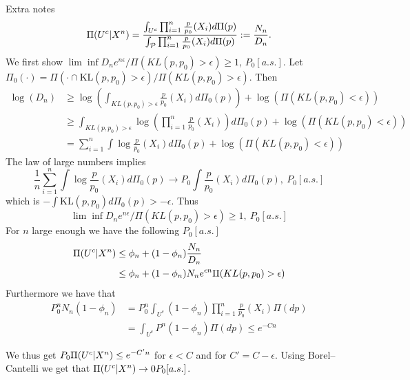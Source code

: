 \begin{frame}[allowframebreaks]{Extra notes} 
$$
\Pi(U^c|X^n) = {\int_{U^c} \prod_{i=1}^n  \frac{p}{p_0}(X_i) d\Pi(p) \over \int_{\mathcal{P}} \prod_{i=1}^n  \frac{p}{p_0}(X_i) d\Pi(p)} := \frac{N_n}{D_n}.
$$
We first show $\lim\inf D_n e^{n\epsilon} / \Pi(KL(p,p_0)>\epsilon)   \geq 1 $, $P_0[a.s.]$. Let $\Pi_0(\cdot) = \Pi(\cdot \cap \text{KL}(p,p_0)>\epsilon)/\Pi(KL(p,p_0)>\epsilon)$. Then 
\begin{align*}
\log(D_n) &\geq \log\left(\int_{KL(p,p_0)>\epsilon} \frac{p}{p_0}(X_i) d\Pi_0(p)\right) + \log(\Pi(KL(p,p_0)<\epsilon)) \\ 
&\geq \int_{KL(p,p_0)>\epsilon} \log\left( \prod_{i=1}^n  \frac{p}{p_0}(X_i) \right) d\Pi_0(p) + \log(\Pi(KL(p,p_0)<\epsilon)) \\ 
&=  \sum_{i=1}^n \int \log \frac{p}{p_0}(X_i) d\Pi_0(p) + \log(\Pi(KL(p,p_0)<\epsilon)) 
\end{align*}
The law of large numbers implies 
$$
\frac{1}{n} \sum_{i=1}^n \int \log \frac{p}{p_0}(X_i) d\Pi_0(p) \to P_0 \int \frac{p}{p_0}(X_i) d\Pi_0(p),~ P_0[a.s.] 
$$
which is $- \int \text{KL}(p,p_0) d\Pi_0(p) > -\epsilon $.
Thus 
$$
\lim\inf D_n e^{n\epsilon} / \Pi(KL(p,p_0)>\epsilon)   \geq 1 ,~ P_0[a.s.]
$$ 
	For $n$ large enough we have the following $P_0[a.s.]$ 
	\begin{align*}
	\Pi(U^c|X^n) & \leq  \phi_n + (1-\phi_n) \frac{N_n}{D_n} \\
                 & \leq \phi_n  + (1-\phi_n) N_n e^{\epsilon n } \Pi(KL(p,p_0)>\epsilon)  
	\end{align*}
Furthermore we have that 
\begin{align*}
P_0^n  N_n (1-\phi_n) &= P_0^n  \int_{U^c} (1-\phi_n) \prod_{i=1}^{n} \frac{p}{p_0}(X_i) \Pi(dp) \\ 
                      &= \int_{U^c} P^n (1-\phi_n) \Pi(dp) \leq e^{-Cn} 
\end{align*}

We thus get $P_0\Pi(U^c|X^n) \leq e^{-C'n}$ for $\epsilon < C$ and for $C' = C - \epsilon$. Using Borel--Cantelli we get that $\Pi(U^c |X^n) \to 0 P_0[a.s.]$. 
\end{frame}

